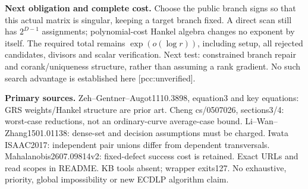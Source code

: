 \documentclass[11pt]{article}
\begin{document}
\textbf{Next obligation and complete cost.} Choose the public branch signs
so that this actual matrix is singular, keeping a target branch fixed. A direct
scan still has $2^{D-1}$ assignments; polynomial-cost Hankel algebra changes
no exponent by itself. The required total remains $\exp(o(\log r))$, including
setup, all rejected candidates, divisors and scalar verification. Next test:
constrained branch repair and corank/uniqueness structure, rather than assuming
a rank gradient. No such search advantage is established here [pcc:unverified].

\textbf{Primary sources.} Zeh--Gentner--Augot1110.3898, equation3 and key
 equations: GRS weights/Hankel structure are prior art. Cheng cs/0507026,
sections3/4: worst-case reductions, not an ordinary-curve average-case bound.
Li--Wan--Zhang1501.01138: dense-set and decision assumptions must be charged.
Iwata ISAAC2017: independent pair unions differ from dependent transversals.
Mahalanobis2607.09814v2: fixed-defect success cost is retained. Exact URLs and
read scopes in README. KB tools absent; wrapper exits127. No exhaustive,
priority, global impossibility or new ECDLP algorithm claim.
\end{document}
